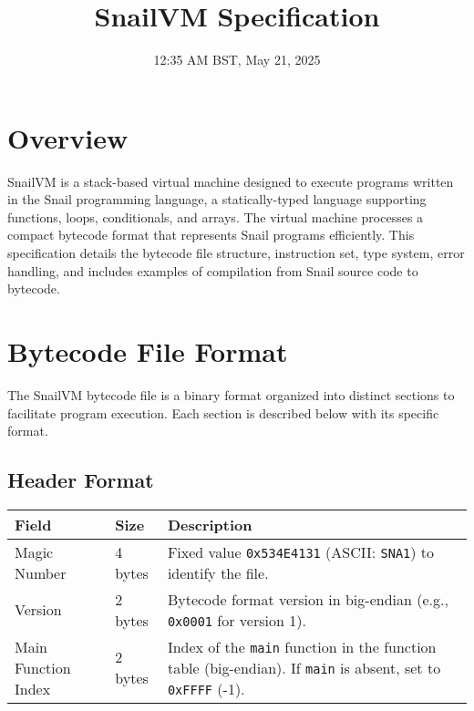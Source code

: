 \documentclass[a4paper,12pt]{article}
\title{\textbf{SnailVM Specification}}
\author{}
\date{12:35 AM BST, May 21, 2025} %
\begin{document}
    \maketitle
    \tableofcontents
    \clearpage

    \section{Overview}
    SnailVM is a stack-based virtual machine designed to execute programs written in the Snail programming language, a statically-typed language supporting functions, loops, conditionals, and arrays. The virtual machine processes a compact bytecode format that represents Snail programs efficiently. This specification details the bytecode file structure, instruction set, type system, error handling, and includes examples of compilation from Snail source code to bytecode.

    \section{Bytecode File Format}
    The SnailVM bytecode file is a binary format organized into distinct sections to facilitate program execution. Each section is described below with its specific format.

    \subsection{Header Format}
    \begin{tabular}{|l|l|p{6cm}|}
        \hline
        \textbf{Field} & \textbf{Size} & \textbf{Description} \\ \hline
        Magic Number & 4 bytes & Fixed value \texttt{0x534E4131} (ASCII: \texttt{SNA1}) to identify the file. \\ \hline
        Version & 2 bytes & Bytecode format version in big-endian (e.g., \texttt{0x0001} for version 1). \\ \hline
        Main Function Index & 2 bytes & Index of the \texttt{main} function in the function table (big-endian). If \texttt{main} is absent, set to \texttt{0xFFFF} (-1). \\ \hline
    \end{tabular}
    \label{tab:header_format}
\end{document}
